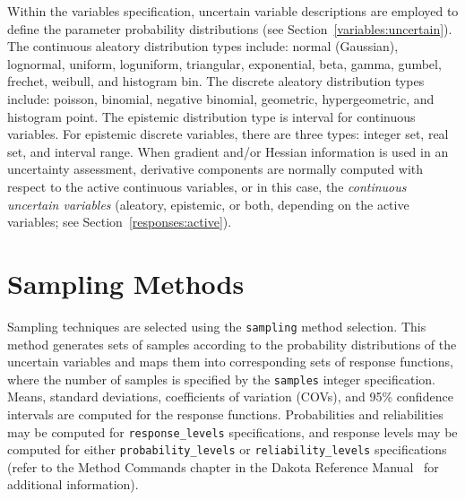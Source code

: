 Within the variables specification, uncertain variable descriptions
are employed to define the parameter probability distributions (see
Section~\ref{variables:uncertain}). The continuous aleatory
distribution types include: normal (Gaussian), lognormal, uniform,
loguniform, triangular, exponential, beta, gamma, gumbel, frechet,
weibull, and histogram bin. The discrete aleatory distribution types
include: poisson, binomial, negative binomial, geometric,
hypergeometric, and histogram point. The epistemic distribution type
is interval for continuous variables. For epistemic discrete variables, 
there are three types:  integer set, real set, and interval range. 
When gradient and/or Hessian information is used in an
uncertainty assessment, derivative components are normally computed
with respect to the active continuous variables, or in this case, the
\emph{continuous uncertain variables} (aleatory, epistemic, 
or both, depending on the active variables; see 
Section~\ref{responses:active}).

\section{Sampling Methods}\label{uq:sampling}

Sampling techniques are selected using the \texttt{sampling}
method selection. This method generates sets of samples according to
the probability distributions of the uncertain variables and maps them
into corresponding sets of response functions, where the number of
samples is specified by the \texttt{samples} integer specification.
Means, standard deviations, coefficients of variation (COVs), and 95\%
confidence intervals are computed for the response functions.
Probabilities and reliabilities may be computed for 
\texttt{response\_levels} specifications, and response levels may be
computed for either \texttt{probability\_levels} or
\texttt{reliability\_levels} specifications (refer to the Method
Commands chapter in the Dakota Reference Manual~\cite{RefMan} for
additional information).

